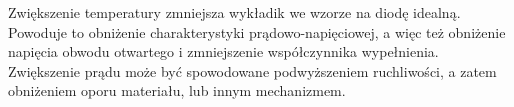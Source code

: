 \documentclass[a4, 12pt]{article}
\begin{document}
	Zwiększenie temperatury zmniejsza wykładik we wzorze na diodę idealną. Powoduje to obniżenie charakterystyki prądowo-napięciowej, a więc też obniżenie napięcia obwodu otwartego i zmniejszenie współczynnika wypełnienia. Zwiększenie prądu może być spowodowane podwyższeniem ruchliwości, a zatem obniżeniem oporu materiału, lub innym mechanizmem. 
\end{document}

